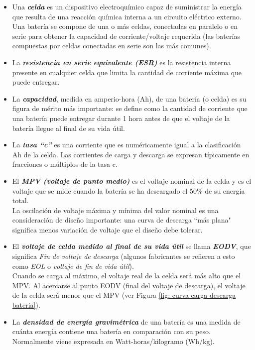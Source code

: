 \documentclass[12pt]{article}
\begin{document}
	\begin{itemize}
		\item  Una \textit{\textbf{celda}} es un dispositivo electroquímico capaz de suministrar la energía que resulta de una reacción química interna a un circuito eléctrico externo. \\
		Una batería se compone de una o más celdas, conectadas en paralelo o en serie para obtener la capacidad de corriente/voltaje requerida (las baterías compuestas por celdas conectadas en serie son las más comunes).
		\item La \textit{\textbf{resistencia en serie equivalente (ESR)}} es la resistencia interna presente en cualquier celda que limita la cantidad de corriente máxima que puede entregar.
		\item La \textit{\textbf{capacidad}}, medida en amperio-hora (Ah), de una batería (o celda) es su figura de mérito más importante: se define como la cantidad de corriente que una batería puede entregar durante 1 hora antes de que el voltaje de la batería llegue al final de su vida útil. 
 		\item La \textit{\textbf{tasa ``c''}}  es una corriente que es numéricamente igual a la clasificación Ah de la celda. Las corrientes de carga y descarga se expresan típicamente en fracciones o múltiplos de la tasa c. 
 		\item El \textit{\textbf{MPV (voltaje de punto medio)}} es el voltaje nominal de la celda y es el voltaje que se mide cuando la batería se ha descargado el 50\% de su energía total. \\
 		\noindent La oscilación de voltaje máxima y mínima del valor nominal es una consideración de diseño importante: una curva de descarga ``más plana" significa menos variación de voltaje que el diseño debe tolerar.
 		\item El \textit{\textbf{voltaje de celda medido al final de su vida útil}} se llama \textit{\textbf{EODV}}, que significa \textit{Fin de voltaje de descarga} (algunos fabricantes se refieren a esto como \textit{EOL} o \textit{voltaje de fin de vida útil}). \\
 		\noindent Cuando se carga al máximo, el voltaje real de la celda será más alto que el MPV. Al acercarse al punto EODV (final del voltaje de descarga), el voltaje de la celda será menor que el MPV (ver Figura \ref{fig: curva carga descarga bateria}). 
 		\item La \textit{\textbf{densidad de energía gravimétrica}} de una batería es una medida de cuánta energía contiene una batería en comparación con su peso. Normalmente viene expresada en Watt-horas/kilogramo (Wh/kg).

\end{itemize}
\end{document}

